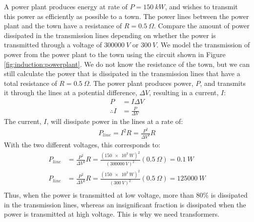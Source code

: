 \begin{example}{A power plant produces energy at rate of $P=\SI{150}{kW}$, and wishes to transmit this power as efficiently as possible to a town. The power lines between the power plant and the town have a resistance of $R=\SI{0.5}{\Omega}$. Compare the amount of power dissipated in the transmission lines depending on whether the power is transmitted through a voltage of $\SI{300000}{V}$ or $\SI{300}{V}$.}
We model the transmission of power from the power plant to the town using the circuit shown in Figure \ref{fig:induction:powerplant}.
We do not know the resistance of the town, but we can still calculate the power that is dissipated in the transmission lines that have a total resistance of $R=\SI{0.5}{\Omega}$. The power plant produces power, $P$, and transmits it through the lines at a potential difference, $\Delta V$, resulting in a current, $I$:
\begin{align*}
P &= I\Delta V\\
\therefore I &= \frac{P}{\Delta V}
\end{align*}
The current, $I$, will dissipate power in the lines at a rate of:
\begin{align*}
P_{line} = I^2 R = \frac{P^2}{\Delta V^2}R
\end{align*}
With the two different voltages, this corresponds to:
\begin{align*}
P_{line}&=\frac{P^2}{\Delta V^2}R=\frac{(\SI{150e3}{W})^2}{(\SI{300000}{V})^2}(\SI{0.5}{\Omega})=\SI{0.1}{W}\\
P_{line}&=\frac{P^2}{\Delta V^2}R=\frac{(\SI{150e3}{W})^2}{(\SI{300}{V})^2}(\SI{0.5}{\Omega})=\SI{125000}{W}\\
\end{align*}
Thus, when the power is transmitted at low voltage, more than 80\% is dissipated in the transmission lines, whereas an insignificant fraction is dissipated when the power is transmitted at high voltage. This is why we need transformers.
\end{example}


